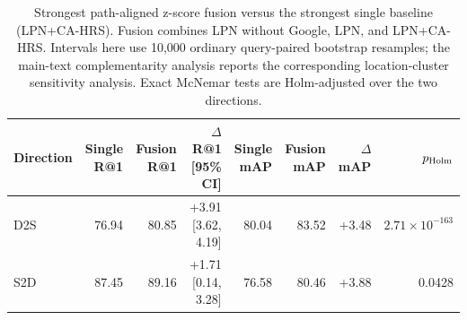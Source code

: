 \begin{table}[!t]
\centering
\small
\caption{Strongest path-aligned z-score fusion versus the strongest single
baseline (LPN+CA-HRS). Fusion combines LPN without Google, LPN, and
LPN+CA-HRS. Intervals here use 10,000 ordinary query-paired bootstrap
resamples; the main-text complementarity analysis reports the corresponding
location-cluster sensitivity analysis. Exact McNemar tests are Holm-adjusted
over the two directions.}
\label{tab:formal-best-fusion}
\begin{tabular}{lrrrrrrr}
\toprule
Direction & Single R@1 & Fusion R@1 & $\Delta$R@1 [95\% CI]
& Single mAP & Fusion mAP & $\Delta$mAP & $p_{\rm Holm}$ \\
\midrule
D2S & 76.94 & 80.85 & +3.91 [3.62, 4.19]
    & 80.04 & 83.52 & +3.48 & $2.71{\times}10^{-163}$ \\
S2D & 87.45 & 89.16 & +1.71 [0.14, 3.28]
    & 76.58 & 80.46 & +3.88 & 0.0428 \\
\bottomrule
\end{tabular}
\end{table}
